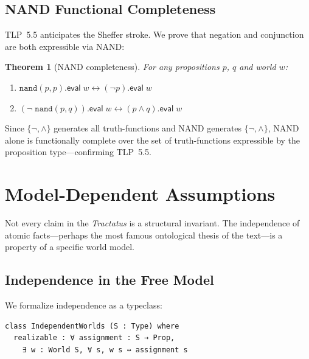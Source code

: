 \documentclass[10pt, letterpaper]{article}
\newtheorem{theorem}{Theorem}[section]
\theoremstyle{definition}
\theoremstyle{remark}
\newcommand{\eval}{\mathsf{eval}}
\begin{document}
\subsection{NAND Functional Completeness}
\label{sec:nand}

TLP~5.5 anticipates the Sheffer stroke.  We prove that negation
and conjunction are both expressible via NAND:

\begin{theorem}[NAND completeness]
\label{thm:nand}
For any propositions $p$, $q$ and world $w$:
\begin{enumerate}[nosep]
  \item $\mathtt{nand}(p, p).\eval\;w \leftrightarrow
    (\lnot p).\eval\;w$
  \item $(\lnot\;\mathtt{nand}(p, q)).\eval\;w \leftrightarrow
    (p \land q).\eval\;w$
\end{enumerate}
\end{theorem}

\noindent
Since $\{\lnot, \land\}$ generates all truth-functions and NAND
generates $\{\lnot, \land\}$, NAND alone is functionally
complete over the set of truth-functions expressible by the
proposition type---confirming TLP~5.5.

\section{Model-Dependent Assumptions}
\label{sec:assumptions}

Not every claim in the \emph{Tractatus} is a structural
invariant.  The independence of atomic facts---perhaps the most
famous ontological thesis of the text---is a property of a
specific world model.

\subsection{Independence in the Free Model}
\label{sec:independence}

We formalize independence as a typeclass:

\begin{lstlisting}
class IndependentWorlds (S : Type) where
  realizable : ∀ assignment : S → Prop,
    ∃ w : World S, ∀ s, w s ↔ assignment s
\end{lstlisting}
\end{document}
